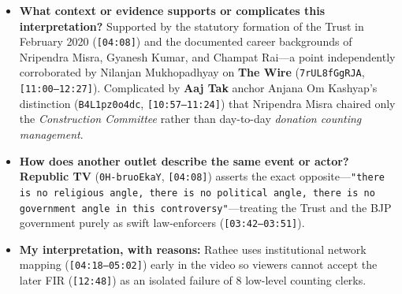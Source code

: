 \documentclass[10pt,a4paper]{article}
\begin{document}
\begin{itemize}[leftmargin=1.5em, itemsep=3pt, topsep=4pt]
  \item \textbf{What context or evidence supports or complicates this interpretation?} Supported by the statutory formation of the Trust in February 2020 (\texttt{[04:08]}) and the documented career backgrounds of Nripendra Misra, Gyanesh Kumar, and Champat Rai---a point independently corroborated by Nilanjan Mukhopadhyay on \textbf{The Wire} (\texttt{7rUL8fGgRJA}, \texttt{[11:00--12:27]}). Complicated by \textbf{Aaj Tak} anchor Anjana Om Kashyap's distinction (\texttt{B4L1pz0o4dc}, \texttt{[10:57--11:24]}) that Nripendra Misra chaired only the \textit{Construction Committee} rather than day-to-day \textit{donation counting management}.
  \item \textbf{How does another outlet describe the same event or actor?} \textbf{Republic TV} (\texttt{0H-bruoEkaY}, \texttt{[04:08]}) asserts the exact opposite---\texttt{"there is no religious angle, there is no political angle, there is no government angle in this controversy"}---treating the Trust and the BJP government purely as swift law-enforcers (\texttt{[03:42--03:51]}).
  \item \textbf{My interpretation, with reasons:} Rathee uses institutional network mapping (\texttt{[04:18--05:02]}) early in the video so viewers cannot accept the later FIR (\texttt{[12:48]}) as an isolated failure of 8 low-level counting clerks.
\end{itemize}
\end{document}
